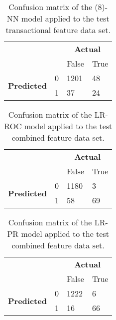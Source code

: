 \begin{table}
\centering
\begin{tabular}{llll}
                                                        &   & \multicolumn{2}{c}{\textbf{Actual}} \\
                                                        &   & False             & True            \\ \hline
\multicolumn{1}{c}{\multirow{2}{*}{\textbf{Predicted}}} & 0 & 1201              & 48              \\
\multicolumn{1}{c}{}                                    & 1 & 37                & 24              \\ \hline
\end{tabular}
\caption{Confusion matrix of the (8)-NN model applied to the test transactional feature data set.}
\label{tab:ch3_cm_nn_trans}
\end{table}

\begin{table}
\centering
\begin{tabular}{llll}
                                                        &   & \multicolumn{2}{c}{\textbf{Actual}} \\
                                                        &   & False             & True            \\ \hline
\multicolumn{1}{c}{\multirow{2}{*}{\textbf{Predicted}}} & 0 & 1180              & 3               \\
\multicolumn{1}{c}{}                                    & 1 & 58                & 69              \\ \hline
\end{tabular}
\caption{Confusion matrix of the LR-ROC model applied to the test combined feature data set.}
\label{tab:ch3_LR_ROC_all}
\end{table}

\begin{table}
\centering
\begin{tabular}{llll}
                                                        &   & \multicolumn{2}{c}{\textbf{Actual}} \\
                                                        &   & False             & True            \\ \hline
\multicolumn{1}{c}{\multirow{2}{*}{\textbf{Predicted}}} & 0 & 1222              & 6               \\
\multicolumn{1}{c}{}                                    & 1 & 16                & 66              \\ \hline
\end{tabular}
\caption{Confusion matrix of the LR-PR model applied to the test combined feature data set.}
\label{tab:ch3_LR_PR_all}
\end{table}

